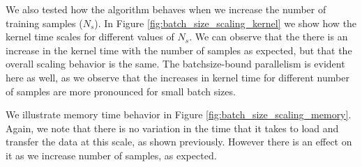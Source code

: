 \documentclass[11pt,a4paper]{article}
\begin{document}
We also tested how the algorithm behaves when we increase the number of
training samples ($N_s$). In Figure \ref{fig:batch_size_scaling_kernel} we show 
how the kernel time scales for different values of $N_s$. 
We can observe that the there is an increase in the kernel time with the 
number of samples as expected, but that the overall scaling behavior is the same. 
The batchsize-bound parallelism is evident here as well, as we observe that the increases in kernel 
time for different number of samples are more pronounced for small batch sizes. 

We illustrate memory time behavior in Figure \ref{fig:batch_size_scaling_memory}. Again, 
we note that there is no variation in the time that it takes to load and transfer the 
data at this scale, as shown previously. However there is an effect on it as we increase
number of samples, as expected. 

\end{document}
